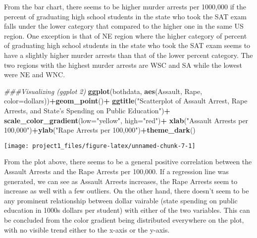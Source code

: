 \documentclass[
]{article}
\newenvironment{Shaded}{\begin{snugshade}}{\end{snugshade}}
\newcommand{\CommentTok}[1]{\textcolor[rgb]{0.56,0.35,0.01}{\textit{#1}}}
\newcommand{\DataTypeTok}[1]{\textcolor[rgb]{0.13,0.29,0.53}{#1}}
\newcommand{\KeywordTok}[1]{\textcolor[rgb]{0.13,0.29,0.53}{\textbf{#1}}}
\newcommand{\NormalTok}[1]{#1}
\newcommand{\OperatorTok}[1]{\textcolor[rgb]{0.81,0.36,0.00}{\textbf{#1}}}
\newcommand{\StringTok}[1]{\textcolor[rgb]{0.31,0.60,0.02}{#1}}
\begin{document}
From the bar chart, there seems to be higher murder arrests per 1000,000
if the percent of graduating high school students in the state who took
the SAT exam falls under the lower category that compared to the higher
one in the same US region. One exception is that of NE region where the
higher category of percent of graduating high school students in the
state who took the SAT exam seems to have a slightly higher murder
arrests than that of the lower percent category. The two regions with
the highest murder arrests are WSC and SA while the lowest were NE and
WNC.

\begin{Shaded}
\begin{Highlighting}[]
\CommentTok{###Visualizing (ggplot 2)}
\KeywordTok{ggplot}\NormalTok{(bothdata, }\KeywordTok{aes}\NormalTok{(Assault, Rape, }\DataTypeTok{color=}\NormalTok{dollars))}\OperatorTok{+}\KeywordTok{geom_point}\NormalTok{()}\OperatorTok{+}
\StringTok{  }\KeywordTok{ggtitle}\NormalTok{(}\StringTok{"Scatterplot of Assault Arrest, Rape Arrests, }
\StringTok{  and State's Spending on Public Education"}\NormalTok{)}\OperatorTok{+}
\StringTok{  }\KeywordTok{scale_color_gradient}\NormalTok{(}\DataTypeTok{low=}\StringTok{"yellow"}\NormalTok{, }\DataTypeTok{high=}\StringTok{"red"}\NormalTok{)}\OperatorTok{+}
\StringTok{  }\KeywordTok{xlab}\NormalTok{(}\StringTok{"Assault Arrests per 100,000"}\NormalTok{)}\OperatorTok{+}\KeywordTok{ylab}\NormalTok{(}\StringTok{"Rape Arrests per 100,000"}\NormalTok{)}\OperatorTok{+}\KeywordTok{theme_dark}\NormalTok{()}
\end{Highlighting}
\end{Shaded}

\begin{center}\texttt{[image: project1\_files/figure-latex/unnamed-chunk-7-1]} \end{center}

From the plot above, there seems to be a general positive correlation
between the Assault Arrests and the Rape Arrests per 100,000. If a
regression line was generated, we can see as Assault Arrests increases,
the Rape Arrests seem to increase as well with a few outliers. On the
other hand, there doesn't seem to be any prominent relationship between
dollar vairable (state spending on public education in 1000s dollars per
student) with either of the two variables. This can be concluded from
the color gradient being distributed everywhere on the plot, with no
visible trend either to the x-axis or the y-axis.
\end{document}
